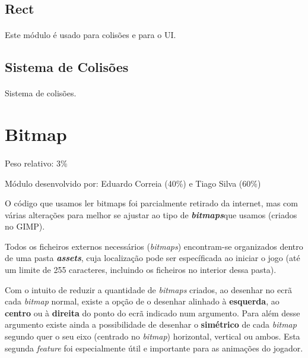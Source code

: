 \documentclass{report}
\begin{document}
\subsection{Rect}

\paragraph{}
Este módulo é usado para colisões e para o UI. 

\subsection{Sistema de Colisões}

\paragraph{}
Sistema de colisões. \newline


\section{Bitmap}

\paragraph{}
Peso relativo: 3\%

Módulo desenvolvido por: Eduardo Correia (40\%) e Tiago Silva (60\%)

O código que usamos ler bitmaps foi parcialmente retirado da internet, mas com várias alterações para melhor se ajustar ao tipo de \textbf{\textit{bitmaps}}que usamos (criados no GIMP).

Todos os ficheiros externos necessários (\textit{bitmaps}) encontram-se organizados dentro de uma pasta \textbf{\textit{assets}}, cuja localização pode ser específicada ao iniciar o jogo (até um limite de 255 caracteres, incluindo os ficheiros no interior dessa pasta).

Com o intuito de reduzir a quantidade de \textit{bitmaps} criados, ao desenhar no ecrã cada \textit{bitmap} normal, existe a opção de o desenhar alinhado à \textbf{esquerda}, ao \textbf{centro} ou à \textbf{direita} do ponto do ecrã indicado num argumento. Para além desse argumento existe ainda a possibilidade de desenhar o \textbf{simétrico} de cada \textit{bitmap} segundo quer o seu eixo (centrado no \textit{bitmap}) horizontal, vertical ou ambos. Esta segunda \textit{feature} foi especialmente útil e importante para as animações do jogador. 
\end{document}
